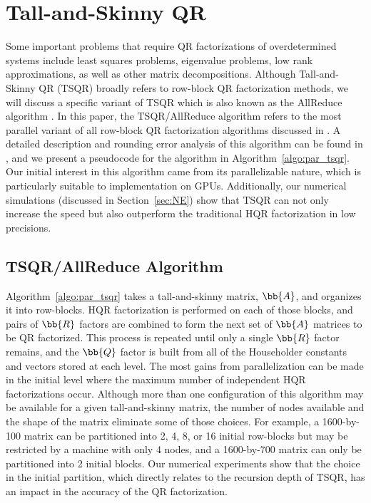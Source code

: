 \section{Tall-and-Skinny QR}
\label{sec:TSQR}
	Some important problems that require QR factorizations of overdetermined systems include least squares problems, eigenvalue problems, low rank approximations, as well as other matrix decompositions.
	Although Tall-and-Skinny QR (TSQR) broadly refers to row-block QR factorization methods, we will discuss a specific variant of TSQR which is also known as the AllReduce algorithm \cite{Mori2012}.
	In this paper, the TSQR/AllReduce algorithm refers to the most parallel variant of all row-block QR factorization algorithms discussed in \cite{Demmel2012}.
	A detailed description and rounding error analysis of this algorithm can be found in \cite{Mori2012}, and we present a pseudocode for the algorithm in Algorithm~\ref{algo:par_tsqr}.
	Our initial interest in this algorithm came from its parallelizable nature, which is particularly suitable to implementation on GPUs. 
	Additionally, our numerical simulations (discussed in Section~\ref{sec:NE}) show that TSQR can not only increase the speed but also outperform the traditional HQR factorization in low precisions.
	\subsection{TSQR/AllReduce Algorithm}
		Algorithm~\ref{algo:par_tsqr} takes a tall-and-skinny matrix, $\bb{A}$, and organizes it into row-blocks. 
		HQR factorization is performed on each of those blocks, and pairs of $\bb{R}$ factors are combined  to form the next set of $\bb{A}$ matrices to be QR factorized. 
		This process is repeated until only a single $\bb{R}$ factor remains, and the $\bb{Q}$ factor is built from all of the Householder constants and vectors stored at each level.
		The most gains from parallelization can be made in the initial level where the maximum number of independent HQR factorizations occur. 
		Although more than one configuration of this algorithm may be available for a given tall-and-skinny matrix, the number of nodes available and the shape of the matrix eliminate some of those choices. 
		For example, a 1600-by-100 matrix can be partitioned into 2, 4, 8, or 16 initial row-blocks but may be restricted by a machine with only 4 nodes, and a 1600-by-700 matrix can only be partitioned into 2 initial blocks.
		Our numerical experiments show that the choice in the initial partition, which directly relates to the recursion depth of TSQR, has an impact in the accuracy of the QR factorization. \par
		
